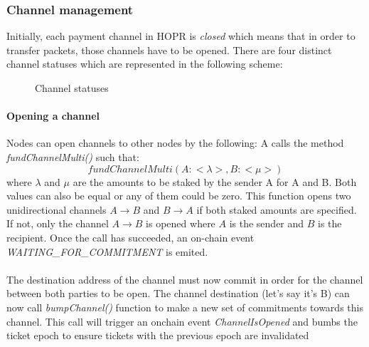 \subsubsection{Channel management}
Initially, each payment channel in HOPR is \textit{closed} which means that in order to transfer packets, those channels have to be opened. There are four distinct channel statuses which are represented in the following scheme:
\begin{figure}[H]
    \begin{center}
        

\end{center}
\label{fig:channel statuses}
    \caption{Channel statuses}
\end{figure}
\paragraph{Opening a channel} Nodes can open channels to other nodes by the following:
A calls the method \textit{fundChannelMulti()} such that:
$$fundChannelMulti(A: <\lambda>, B:<\mu> )$$ where $\lambda$ and $\mu$ are the amounts to be staked by the sender A for A and B. Both values can also be equal or any of them could be zero. This function opens two unidirectional channels $A\rightarrow B$ and $B\rightarrow A$ if both staked amounts are specified. If not, only the channel $A\rightarrow B$ is opened where $A$ is the sender and $B$ is the recipient.
Once the call has succeeded, an on-chain event \textit{WAITING\_FOR\_COMMITMENT} is emited. 
\\~\\The destination address of the channel must now commit in order for the channel between both parties to be open. 
The channel destination (let's say it's B) can now call \textit{bumpChannel()} function to make a new set of commitments towards this channel. This call will trigger an onchain event \textit{ChannelIsOpened} and bumbs the ticket epoch to ensure tickets with the previous epoch are invalidated
